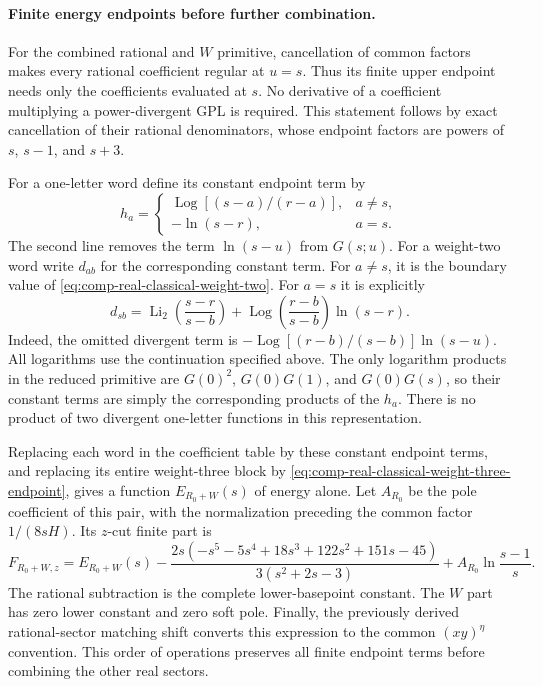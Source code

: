 \paragraph{Finite energy endpoints before further combination.}
For the combined rational and $W$ primitive, cancellation of common
factors makes every rational coefficient regular at $u=s$. Thus its
finite upper endpoint needs only the coefficients evaluated at $s$.
No derivative of a coefficient multiplying a power-divergent GPL is
required. This statement follows by exact cancellation of their rational
denominators, whose endpoint factors are powers of $s$, $s-1$, and $s+3$.

For a one-letter word define its constant endpoint term by
\begin{equation}
 h_a=\begin{cases}
 \operatorname{Log}[(s-a)/(r-a)],&a\ne s,\\
 -\ln(s-r),&a=s.
 \end{cases}
\end{equation}
The second line removes the term $\ln(s-u)$ from $G(s;u)$.
For a weight-two word write $d_{ab}$ for the corresponding constant term.
For $a\ne s$, it is the boundary value of
\eqref{eq:comp-real-classical-weight-two}. For $a=s$ it is explicitly
\begin{equation}
 d_{sb}=\operatorname{Li}_2\left(\frac{s-r}{s-b}\right)
 +\operatorname{Log}\left(\frac{r-b}{s-b}\right)\ln(s-r).
\end{equation}
Indeed, the omitted divergent term is
$-\operatorname{Log}[(r-b)/(s-b)]\ln(s-u)$.
All logarithms use the continuation specified above. The only
logarithm products in the reduced primitive are $G(0)^2$, $G(0)G(1)$,
and $G(0)G(s)$, so their constant terms are simply the corresponding
products of the $h_a$. There is no product of two divergent one-letter
functions in this representation.

Replacing each word in the coefficient table by these constant endpoint
terms, and replacing its entire weight-three block by
\eqref{eq:comp-real-classical-weight-three-endpoint}, gives a function
$E_{R_0+W}(s)$ of energy alone. Let $A_{R_0}$ be the pole coefficient of
this pair, with the normalization preceding the common factor $1/(8sH)$.
Its $z$-cut finite part is
\begin{equation}
 F_{R_0+W,z}=E_{R_0+W}(s)
 -\frac{2s(-s^5-5s^4+18s^3+122s^2+151s-45)}{3(s^2+2s-3)}
 +A_{R_0}\ln\frac{s-1}{s}.
\end{equation}
The rational subtraction is the complete lower-basepoint constant.
The $W$ part has zero lower constant and zero soft pole. Finally, the
previously derived rational-sector matching shift converts this expression
to the common $(xy)^\eta$ convention. This order of operations preserves
all finite endpoint terms before combining the other real sectors.

